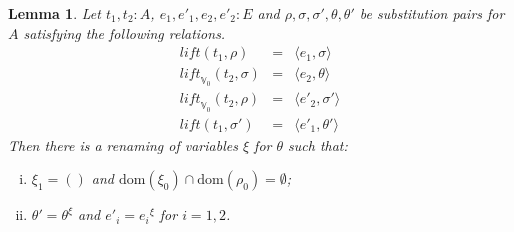 \documentclass{article}
\newtheorem{lemma}[definition]{Lemma}
\newcommand{\V}{{\mathbb V}}
\newcommand{\liftv}[1]{\ensuremath{\mathit{lift}_{\V_{#1}}}}
\newcommand{\lift}{\ensuremath{\mathit{lift}}}
\newcommand{\dom}{\ensuremath{\mathrm{dom}}}
\newcommand{\renamevar}[2]{\ensuremath{{#1}^{#2}}}
\newcommand{\isrenamevar}[3]{\ensuremath{{#1}=\renamevar{#2}{#3}}}
\newcommand{\idn}{()}
\begin{document}
\begin{lemma}\label{liftcommv0}
Let $t_1,t_2:A$, $e_1,e'_1,e_2,e'_2:E$ and
$\rho,\sigma,\sigma',\theta,\theta'$ be substitution pairs for $A$
satisfying the following relations.
\begin{eqnarray*}
\lift(t_1,\rho) & = & \langle e_1,\sigma\rangle\\
\liftv0(t_2,\sigma) & = & \langle e_2,\theta\rangle\\
\liftv0(t_2,\rho) & = & \langle e'_2,\sigma'\rangle\\
\lift(t_1,\sigma') & = & \langle e'_1,\theta'\rangle
\end{eqnarray*}
Then there is a renaming of variables $\xi$ for $\theta$ such that:
\begin{enumerate}[(i)]
\item\label{domxi0} $\xi_1=\idn$ and
$\dom(\xi_0)\cap\dom(\rho_0)=\emptyset$;
\item\label{replxi0} {\isrenamevar{\theta'}\theta\xi} and
{\isrenamevar{e'_i}{e_i}\xi} for $i=1,2$.
\end{enumerate}
\end{lemma}
\end{document}
